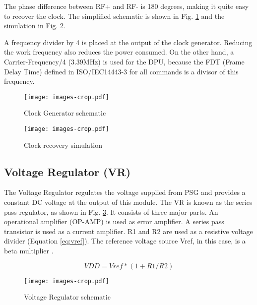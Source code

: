 The phase difference between RF+ and RF- is 180 degrees, making it quite easy to recover the clock. The simplified schematic is shown in Fig. \ref{fig:clk} and the simulation in Fig. \ref{fig:clk_sim}.

A frequency divider by 4 is placed at the output of the clock generator. Reducing the work frequency also reduces the power consumed. On the other hand, a Carrier-Frequency/4 (3.39MHz) is used for the DPU, because the FDT (Frame Delay Time) defined in ISO/IEC14443-3 for all commands is a divisor of this frequency.
 

\begin{figure}[]
  \centering
  \texttt{[image: images-crop.pdf]}
  \caption{Clock Generator schematic}
  \label{fig:clk}
\end{figure}

\begin{figure}[]
  \centering
  \texttt{[image: images-crop.pdf]}
  \caption{Clock recovery simulation}
  \label{fig:clk_sim}
\end{figure}

\subsection{Voltage Regulator (VR)}

The Voltage Regulator \cite{rfid_ldo} regulates the voltage supplied from PSG and provides a constant DC voltage at the output of this module. The VR is known as the series pass regulator, as shown in Fig. \ref{fig:ldo}. It consists of three major parts. An operational amplifier (OP-AMP) is used as error amplifier. A series pass transistor is used as a current amplifier. R1 and R2 are used as a resistive voltage divider (Equation \ref{eq:vref}). The reference voltage source Vref, in this case, is a beta multiplier \cite{panadero}. 

\begin{equation} \label{eq:vref}
VDD = Vref*(1+R1/R2)
\end{equation}


\begin{figure}[]
  \centering
  \texttt{[image: images-crop.pdf]}
  \caption{Voltage Regulator schematic}
  \label{fig:ldo}
\end{figure}

